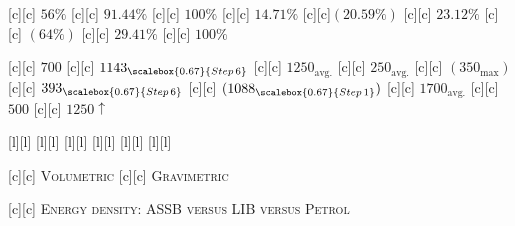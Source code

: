 [c][c] {\tiny $56\%$}
[c][c] {\tiny $91.44\%$}
[c][c] {\tiny $100\%$}
[c][c] {\tiny $14.71\%$}
[c][c]{\tiny $(20.59\%)$}
[c][c] {\tiny $23.12\%$}
[c][c] {\tiny $(64\%)$}
[c][c] {\tiny $29.41\%$}
[c][c] {\tiny $100\%$}


[c][c] {\tiny $700$}
[c][c] {\tiny $1143_{\scalebox{0.67}{Step\,6}}$}
[c][c] {\tiny $1250_{\text{avg.}}$}
[c][c] {\tiny $250_{\text{avg.}}$}
[c][c] {\tiny $(350_{\max})$}
[c][c] {\tiny $ 393_{\scalebox{0.67}{Step\,6}}$}
[c][c] {\tiny $(1088_{\scalebox{0.67}{Step\,1}})$}
[c][c] {\tiny $1700_{\text{avg.}}$}
[c][c] {\tiny $500$}
[c][c] {\tiny $1250\!\uparrow$}

[l][l] {}
[l][l] {}
[l][l] {}
[l][l] {}
[l][l] {}
[l][l] {}


[c][c] {\tiny \textsc{Volumetric}}
[c][c] {\tiny \textsc{Gravimetric}}

[c][c] {\scriptsize
	\textsc{Energy density}: ASSB \textsc{versus} LIB \textsc{versus} \textsc{Petrol}}


